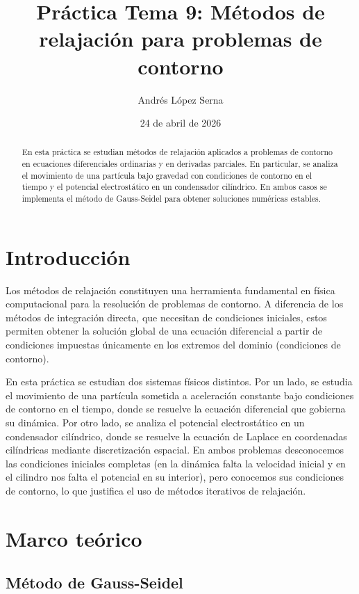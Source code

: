 \documentclass[12pt]{article}
\title{Práctica Tema 9: Métodos de relajación para problemas de contorno}
\author{Andrés López Serna}
\date{24 de abril de 2026}
\begin{document}
\maketitle

\begin{abstract}

En esta práctica se estudian métodos de relajación aplicados a problemas de contorno en ecuaciones diferenciales ordinarias y en derivadas parciales. En particular, se analiza el movimiento de una partícula bajo gravedad con condiciones de contorno en el tiempo y el potencial electrostático en un condensador cilíndrico. En ambos casos se implementa el método de Gauss-Seidel para obtener soluciones numéricas estables.

\end{abstract}

\section{Introducción}

Los métodos de relajación constituyen una herramienta fundamental en física computacional para la resolución de problemas de contorno. A diferencia de los métodos de integración directa, que necesitan de condiciones iniciales, estos permiten obtener la solución global de una ecuación diferencial a partir de condiciones impuestas únicamente en los extremos del dominio (condiciones de contorno).

En esta práctica se estudian dos sistemas físicos distintos. Por un lado, se estudia el movimiento de una partícula sometida a aceleración constante bajo condiciones de contorno en el tiempo, donde se resuelve la ecuación diferencial que gobierna su dinámica. Por otro lado, se analiza el potencial electrostático en un condensador cilíndrico, donde se resuelve la ecuación de Laplace en coordenadas cilíndricas mediante discretización espacial. En ambos problemas desconocemos las condiciones iniciales completas (en la dinámica falta la velocidad inicial y en el cilindro nos falta el potencial en su interior), pero conocemos sus condiciones de contorno, lo que justifica el uso de métodos iterativos de relajación.

\section{Marco teórico}

\subsection{Método de Gauss-Seidel}
\end{document}
